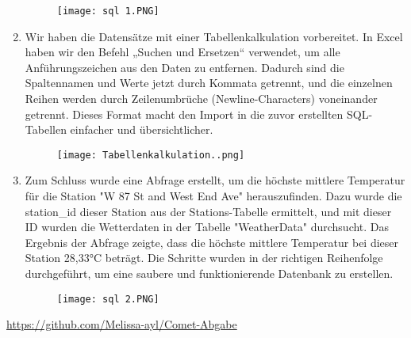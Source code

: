 \documentclass{article}
\begin{document}
\begin{enumerate}
\begin{figure}[H] %
    \centering
    \texttt{[image: sql 1.PNG]}
\end{figure}
\newpage
\item Wir haben die Datensätze mit einer Tabellenkalkulation vorbereitet. In Excel haben wir den Befehl „Suchen und Ersetzen“ verwendet, um alle Anführungszeichen aus den Daten zu entfernen. Dadurch sind die Spaltennamen und Werte jetzt durch Kommata getrennt, und die einzelnen Reihen werden durch Zeilenumbrüche (Newline-Characters) voneinander getrennt. Dieses Format macht den Import in die zuvor erstellten SQL-Tabellen einfacher und übersichtlicher.

\begin{figure}[H] %
    \centering
    \texttt{[image: Tabellenkalkulation..png]}
\end{figure}

\newpage
\item Zum Schluss wurde eine Abfrage erstellt, um die höchste mittlere Temperatur für die Station "W 87 St and West End Ave" herauszufinden. Dazu wurde die station\_id dieser Station aus der Stations-Tabelle ermittelt, und mit dieser ID wurden die Wetterdaten in der Tabelle "WeatherData" durchsucht. Das Ergebnis der Abfrage zeigte, dass die höchste mittlere Temperatur bei dieser Station 28,33°C beträgt. Die Schritte wurden in der richtigen Reihenfolge durchgeführt, um eine saubere und funktionierende Datenbank zu erstellen.

\begin{figure}[H] %
    \centering
    \texttt{[image: sql 2.PNG]}
\end{figure}


\end{enumerate}
\newpage






\url{https://github.com/Melissa-ayl/Comet-Abgabe }
\end{document}
